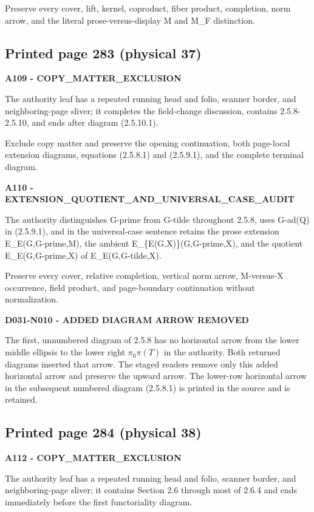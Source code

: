 \documentclass[10pt,a4paper]{article}
\begin{document}
Preserve every cover, lift, kernel, coproduct, fiber product, completion, norm arrow, and the literal prose-versus-display M and M\_F distinction.

\subsection{Printed page 283 (physical 37)}

\textbf{A109 - COPY\_MATTER\_EXCLUSION}

The authority leaf has a repeated running head and folio, scanner border, and neighboring-page sliver; it completes the field-change discussion, contains 2.5.8-2.5.10, and ends after diagram (2.5.10.1).

Exclude copy matter and preserve the opening continuation, both page-local extension diagrams, equations (2.5.8.1) and (2.5.9.1), and the complete terminal diagram.

\textbf{A110 - EXTENSION\_QUOTIENT\_AND\_UNIVERSAL\_CASE\_AUDIT}

The authority distinguishes G-prime from G-tilde throughout 2.5.8, uses G-ad(Q) in (2.5.9.1), and in the universal-case sentence retains the prose extension E\_E(G,G-prime,M), the ambient E\_\{E(G,X)\}(G,G-prime,X), and the quotient E\_E(G,G-prime,X) of E\_E(G,G-tilde,X).

Preserve every cover, relative completion, vertical norm arrow, M-versus-X occurrence, field product, and page-boundary continuation without normalization.

\textbf{D031-N010 - ADDED DIAGRAM ARROW REMOVED}

The first, unnumbered diagram of 2.5.8 has no horizontal arrow from the lower middle ellipsis to the lower right \(\pi_0\pi(T)\) in the authority. Both returned diagrams inserted that arrow. The staged readers remove only this added horizontal arrow and preserve the upward arrow. The lower-row horizontal arrow in the subsequent numbered diagram (2.5.8.1) is printed in the source and is retained.

\subsection{Printed page 284 (physical 38)}

\textbf{A112 - COPY\_MATTER\_EXCLUSION}

The authority leaf has a repeated running head and folio, scanner border, and neighboring-page sliver; it contains Section 2.6 through most of 2.6.4 and ends immediately before the first functoriality diagram.
\end{document}
